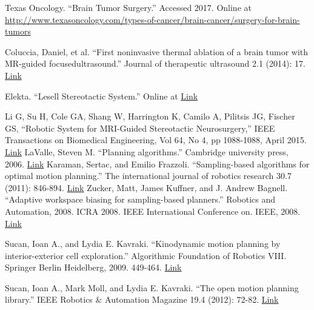\documentclass[12pt]{report}
\begin{document}
\begin{thebibliography}{99}

 Texas Oncology. ``Brain Tumor Surgery.'' Accessed 2017. Online at \url{http://www.texasoncology.com/types-of-cancer/brain-cancer/surgery-for-brain-tumors}

 Coluccia, Daniel, et al. ``First noninvasive thermal ablation of a brain tumor with MR-guided focusedultrasound.'' Journal of therapeutic ultrasound 2.1 (2014): 17. \href{https://jtultrasound.biomedcentral.com/articles/10.1186/2050-5736-2-17}{Link}

 Elekta. ``Lesell Stereotactic System.'' Online at \href{https://www.elekta.com/neurosurgery/leksell-stereotactic-system.html}{Link}

 Li G, Su H, Cole GA, Shang W, Harrington K, Camilo A, Pilitsis JG, Fischer GS, ``Robotic System for MRI-Guided Stereotactic Neurosurgery,'' IEEE Transactions on Biomedical Engineering, Vol 64, No 4, pp 1088-1088, April 2015. \href{http://aimlab.wpi.edu/includes/publications/2014_TBME_Li_Fischer_RoboticSystemforMRIGuidedStereotacticNeurosurgery.pdf}{Link}
 LaValle, Steven M. ``Planning algorithms.'' Cambridge university press, 2006. \href{http://citeseerx.ist.psu.edu/viewdoc/download?doi=10.1.1.225.1874&rep=rep1&type=pdf}{Link}
 Karaman, Sertac, and Emilio Frazzoli. ``Sampling-based algorithms for optimal motion planning.'' The international journal of robotics research 30.7 (2011): 846-894. \href{http://citeseerx.ist.psu.edu/viewdoc/download?doi=10.1.1.419.5503&rep=rep1&type=pdf}{Link}
 Zucker, Matt, James Kuffner, and J. Andrew Bagnell. ``Adaptive workspace biasing for sampling-based planners.'' Robotics and Automation, 2008. ICRA 2008. IEEE International Conference on. IEEE, 2008. \href{http://www.ri.cmu.edu/pub_files/pub4/zucker_matthew_2008_1/zucker_matthew_2008_1.pdf}{Link}

 Sucan, Ioan A., and Lydia E. Kavraki. ``Kinodynamic motion planning by interior-exterior cell exploration.'' Algorithmic Foundation of Robotics VIII. Springer Berlin Heidelberg, 2009. 449-464. \href{http://www.wafr.org/wafr2008/papers/wafr08-sucan.pdf}{Link}

 Sucan, Ioan A., Mark Moll, and Lydia E. Kavraki. ``The open motion planning library.'' IEEE Robotics \& Automation Magazine 19.4 (2012): 72-82. \href{http://ieeexplore.ieee.org/abstract/document/6377468/}{Link}


\end{thebibliography}
\end{document}

